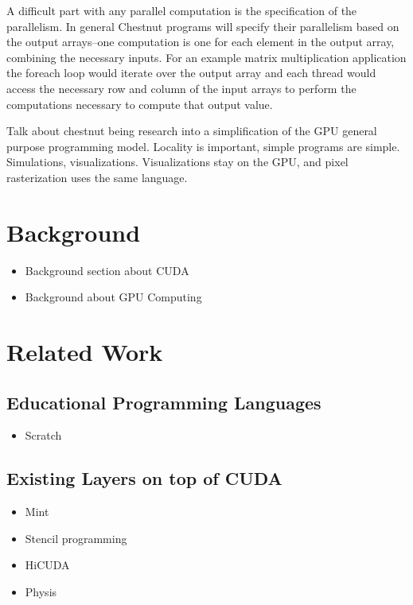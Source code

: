 A difficult part with any parallel computation is the specification of the
parallelism. In general Chestnut programs will specify their parallelism based
on the output arrays--one computation is one for each element in the output
array, combining the necessary inputs. For an example matrix multiplication
application the foreach loop would iterate over the output array and each
thread would access the necessary row and column of the input arrays to perform
the computations necessary to compute that output value. 

Talk about chestnut being research into a simplification of the GPU general
purpose programming model. Locality is important, simple programs are simple.
Simulations, visualizations. Visualizations stay on the GPU, and pixel
rasterization uses the same language.


\section{Background}

\begin{itemize}
\item Background section about CUDA
\item Background about GPU Computing
\end{itemize}

\section{Related Work}

\subsection{Educational Programming Languages}

\begin{itemize}
\item Scratch
\end{itemize}

\subsection{Existing Layers on top of CUDA}
\begin{itemize}
\item Mint
\item Stencil programming
\item HiCUDA
\item Physis
\end{itemize}

